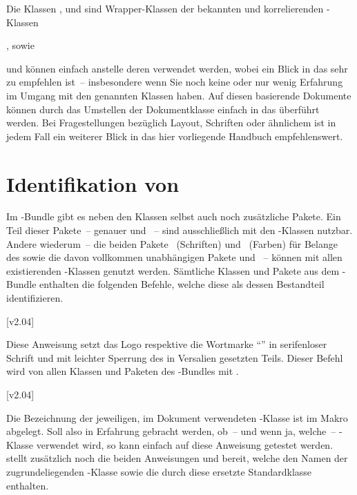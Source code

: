 Die Klassen ,  und  
sind Wrapper-Klassen der bekannten und korrelierenden \KOMAScript-Klassen 
\begin{Entity}{}
,  sowie 
\end{Entity}
und können einfach anstelle deren verwendet werden, wobei ein Blick in das 
\scrguide sehr zu empfehlen ist~-- insbesondere wenn Sie noch keine oder nur 
wenig Erfahrung im Umgang mit den genannten Klassen haben. Auf diesen 
basierende Dokumente können durch das Umstellen der Dokumentklasse einfach in 
das \TUDCD überführt werden. Bei Fragestellungen bezüglich Layout, Schriften 
oder ähnlichem ist in jedem Fall ein weiterer Blick in das hier vorliegende 
Handbuch empfehlenswert.



\section{Identifikation von \TUDScript}

Im \TUDScript-Bundle gibt es neben den Klassen selbst auch noch zusätzliche 
Pakete. Ein Teil dieser Pakete~-- genauer  und 
~-- sind ausschließlich mit den \TUDScript-Klassen nutzbar.
Andere wiederum~-- die beiden Pakete ~(Schriften) und 
~(Farben) für Belange des \CDs sowie die davon vollkommen 
unabhängigen Pakete  und ~-- können mit 
allen existierenden -Klassen genutzt werden. Sämtliche 
Klassen und Pakete aus dem \TUDScript-Bundle enthalten die folgenden Befehle, 
welche diese als dessen Bestandteil identifizieren.
\begin{Declaration}
  {}
  [v2.04]
\printdeclarationlist

Diese Anweisung setzt das Logo respektive die Wortmarke \enquote{\TUDScript{}} 
in serifenloser Schrift und mit leichter Sperrung des in Versalien gesetzten 
Teils. Dieser Befehl wird von allen Klassen und Paketen des \TUDScript-Bundles 
mit .
\end{Declaration}

\begin{Declaration}
  {}
  [v2.04]
\printdeclarationlist

Die Bezeichnung der jeweiligen, im Dokument verwendeten \TUDScript-Klasse ist 
im Makro  abgelegt. Soll also in Erfahrung gebracht 
werden, ob~-- und wenn ja, welche~-- \TUDScript-Klasse verwendet wird, so kann 
einfach auf diese Anweisung getestet werden. \KOMAScript stellt zusätzlich 
noch die beiden Anweisungen  und  
bereit, welche den Namen der zugrundeliegenden \KOMAScript-Klasse sowie die 
durch diese ersetzte Standardklasse enthalten.
\end{Declaration}

